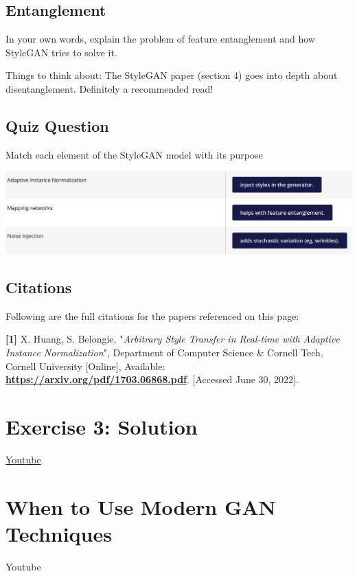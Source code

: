 \subsection{Entanglement}
In your own words, explain the problem of feature entanglement and how StyleGAN tries to solve it. \newline

Things to think about: The StyleGAN paper (section 4) goes into depth about disentanglement. Definitely a recommended read!

\subsection{Quiz Question}
Match each element of the StyleGAN model with its purpose

\includegraphics[width=1\linewidth]{img//genAdvNet//modernGAN/quiz_styleGAN.png}

\subsection{Citations}
Following are the full citations for the papers referenced on this page: \newline

\textbf{[1]} X. Huang, S. Belongie, "\textit{Arbitrary Style Transfer in Real-time with Adaptive Instance Normalization}", Department of Computer Science \& Cornell Tech, Cornell University [Online], Available: \href{https://arxiv.org/pdf/1703.06868.pdf}{\textbf{https://arxiv.org/pdf/1703.06868.pdf}}. [Accessed June 30, 2022].

\section{Exercise 3: Solution}
\href{https://www.youtube.com/watch?v=6E98tNss7Y8}{Youtube}

\section{When to Use Modern GAN Techniques}
Youtube \newline

